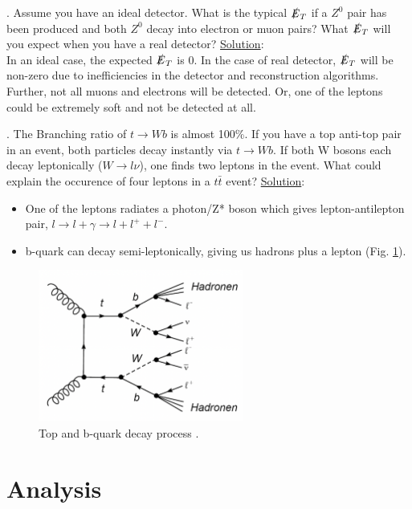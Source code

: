 \documentclass[a4paper]{report}
\numberwithin{equation}{section}
\begin{document}
\bigbreak

. Assume you have an ideal detector. What is the typical $\slashed{E}_T$ if a $Z^0$ pair has been produced and both $Z^0$ decay into electron or muon pairs? What $\slashed{E}_T$ will you expect when you have a real detector?
\bigbreak
\noindent \underline{Solution}: \\
\noindent In an ideal case, the expected $\slashed{E}_T$ is 0. In the case of real detector, $\slashed{E}_T$ will be non-zero due to inefficiencies in the detector and reconstruction algorithms. Further, not all muons and electrons will be detected. Or, one of the leptons could be extremely soft and not be detected at all. 

\bigbreak

. The Branching ratio of $t \rightarrow W b$ is almost 100\%. If you have a top anti-top pair in an event, both particles decay instantly via $t \rightarrow W b$. If both W bosons each decay leptonically ($W \rightarrow l \nu$), one finds two leptons in the event. What could explain the occurence of four leptons in a $t \bar{t}$ event?
\bigbreak
\noindent \underline{Solution}: \\
\begin{itemize}
	\item One of the leptons radiates a photon/Z* boson which gives lepton-antilepton pair, $l \rightarrow l + \gamma \rightarrow l + l^+ + l^-$.
	\item b-quark can decay semi-leptonically, giving us hadrons plus a lepton (Fig. \ref{fig:bdecay}).
\end{itemize}

\begin{figure}[htpb]
    \centering
    \includegraphics[width=0.6\textwidth]{bdecay}
    \caption{Top and b-quark decay process \cite{labman}.}
    \label{fig:bdecay}
\end{figure}

\chapter{Analysis} \label{chap:analysis}
\end{document}
